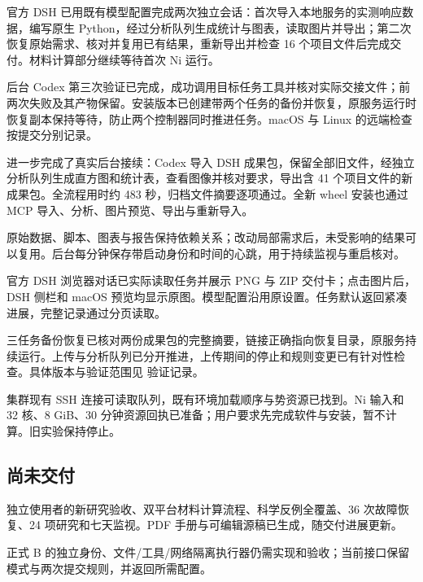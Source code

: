 \documentclass[11pt,a4paper]{ctexart}
\begin{document}
官方 DSH 已用既有模型配置完成两次独立会话：首次导入本地服务的实测响应数据，编写原生 Python，经过分析队列生成统计与图表，读取图片并导出；第二次恢复原始需求、核对并复用已有结果，重新导出并检查 16 个项目文件后完成交付。材料计算部分继续等待首次 Ni 运行。



后台 Codex 第三次验证已完成，成功调用目标任务工具并核对实际交接文件；前两次失败及其产物保留。安装版本已创建带两个任务的备份并恢复，原服务运行时恢复副本保持等待，防止两个控制器同时推进任务。macOS 与 Linux 的远端检查按提交分别记录。



进一步完成了真实后台接续：Codex 导入 DSH 成果包，保留全部旧文件，经独立分析队列生成直方图和统计表，查看图像并核对要求，导出含 41 个项目文件的新成果包。全流程用时约 483 秒，归档文件摘要逐项通过。全新 wheel 安装也通过 MCP 导入、分析、图片预览、导出与重新导入。



原始数据、脚本、图表与报告保持依赖关系；改动局部需求后，未受影响的结果可以复用。后台每分钟保存带启动身份和时间的心跳，用于持续监视与重启核对。



官方 DSH 浏览器对话已实际读取任务并展示 PNG 与 ZIP 交付卡；点击图片后，DSH 侧栏和 macOS 预览均显示原图。模型配置沿用原设置。任务默认返回紧凑进展，完整记录通过分页读取。



三任务备份恢复已核对两份成果包的完整摘要，链接正确指向恢复目录，原服务持续运行。上传与分析队列已分开推进，上传期间的停止和规则变更已有针对性检查。具体版本与验证范围见 验证记录。



集群现有 SSH 连接可读取队列，既有环境加载顺序与势资源已找到。Ni 输入和 32 核、8 GiB、30 分钟资源回执已准备；用户要求先完成软件与安装，暂不计算。旧实验保持停止。



\subsection{尚未交付}


独立使用者的新研究验收、双平台材料计算流程、科学反例全覆盖、36 次故障恢复、24 项研究和七天监视。PDF 手册与可编辑源稿已生成，随交付进展更新。



正式 B 的独立身份、文件/\allowbreak{}工具/\allowbreak{}网络隔离执行器仍需实现和验收；当前接口保留模式与两次提交规则，并返回所需配置。
\end{document}
